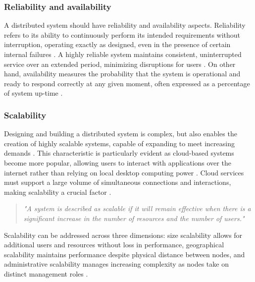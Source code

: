 \subsubsection{Reliability and availability}

A distributed system should have reliability and availability aspects. Reliability refers to its ability to continuously perform its intended requirements without interruption, operating exactly as designed, even in the presence of certain internal failures \cite{Ahmed2013}. A highly reliable system maintains consistent, uninterrupted service over an extended period, minimizing disruptions for users \cite{Tanenbaum2023}. On other hand, availability measures the probability that the system is operational and ready to respond correctly at any given moment, often expressed as a percentage of system up-time \cite{Tanenbaum2023, atlassian-availability}. 

\subsubsection{Scalability}

Designing and building a distributed system is complex, but also enables the creation of highly scalable systems, capable of expanding to meet increasing demands \cite{Tanenbaum2023, Vitillo2021, Valkov2018}. This characteristic is particularly evident as cloud-based systems become more popular, allowing users to interact with applications over the internet rather than relying on local desktop computing power \cite{Lindsay2021}. Cloud services must support a large volume of simultaneous connections and interactions, making scalability a crucial factor \cite{Tanenbaum2023}.

\begin{quote}
	\textit{"A system is described as scalable if it will remain effective when there is a significant increase in the number of resources and the number of users."} \cite{Coulouris2012}
\end{quote}

Scalability can be addressed across three dimensions: size scalability allows for additional users and resources without loss in performance, geographical scalability maintains performance despite physical distance between nodes, and administrative scalability manages increasing complexity as nodes take on distinct management roles \cite{Tanenbaum2023}.

